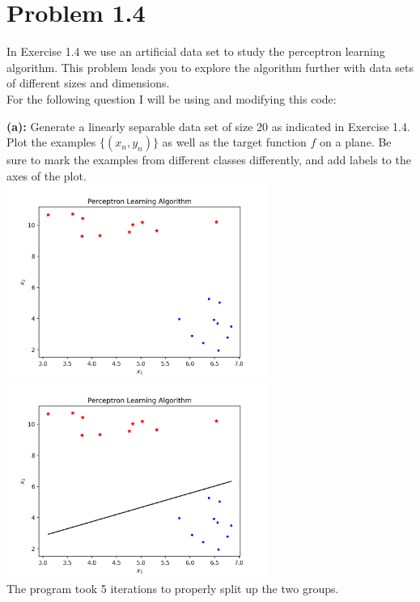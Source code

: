 \documentclass[a4paper]{article}
\begin{document}
\section{Problem 1.4}
In Exercise 1.4 we use an artificial data set to study the 
perceptron learning algorithm. This problem leads you to explore the algorithm
further with data sets of different sizes and dimensions. \\
\indent For the following question I will be using and modifying 
this code: 

\indent \textbf{(a):} Generate a linearly separable data set of 
size 20 as indicated in Exercise 1.4. Plot the examples
$\{(x_n,y_n)\}$ as well as the target function $f$ on a plane. Be sure
to mark the examples from different classes differently, 
and add labels to the axes of the plot. \\
\includegraphics[width=85mm]{a_1.png} 
\includegraphics[width=85mm]{a_2.png} \\
The program took 5 iterations to properly split up the two groups. \\
\end{document}

